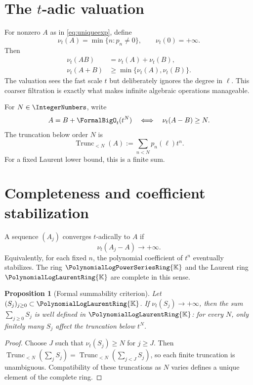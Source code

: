\documentclass[11pt,oneside,openany]{book}
\newtheorem{proposition}[theorem]{Proposition}
\newcommand{\K}{\mathbb{K}}
\newcommand{\Rring}{\PolynomialLogPowerSeriesRing{\K}}
\newcommand{\Pring}{\PolynomialLogLaurentRing{\K}}
\newcommand{\ordt}{\nu_t}
\newcommand{\TransseriesTruncateBelow}[2]{%
  \operatorname{Trunc}_{<#2}\!\left(#1\right)%
}
\begin{document}
\section{The \texorpdfstring{\(t\)}{t}-adic valuation}
For nonzero \(A\) as in \cref{eq:uniqueexp}, define
\begin{equation}\label{eq:valuation}
  \ordt(A)=\min\{n:p_n\neq0\},
  \qquad
  \ordt(0)=+\infty.
\end{equation}
Then
\begin{align}
 \ordt(AB)&=\ordt(A)+\ordt(B),\label{eq:valprod}\\
 \ordt(A+B)&\geq\min\{\ordt(A),\ordt(B)\}.
 \label{eq:valsum}
\end{align}
The valuation sees the fast scale \(t\) but deliberately ignores the degree in
\(\ell\).  This coarser filtration is exactly what makes infinite algebraic
operations manageable.

For \(N\in\IntegerNumbers\), write
\[
  A=B+\FormalBigO_t(t^N)
  \quad\Longleftrightarrow\quad
  \ordt(A-B)\geq N.
\]
The truncation below order \(N\) is
\begin{equation}\label{eq:truncdef}
  \TransseriesTruncateBelow{A}{N}:=\sum_{n<N}p_n(\ell)t^n.
\end{equation}
For a fixed Laurent lower bound, this is a finite sum.

\section{Completeness and coefficient stabilization}
A sequence \((A_j)\) converges \(t\)-adically to \(A\) if
\[
  \ordt(A_j-A)\longrightarrow+\infty.
\]
Equivalently, for each fixed \(n\), the polynomial coefficient of \(t^n\)
eventually stabilizes.  The ring \(\Rring\) and the Laurent ring \(\Pring\) are
complete in this sense.

\begin{proposition}[Formal summability criterion]\label{prop:summability}
Let \((S_j)_{j\geq0}\subset\Pring\).  If
\(\ordt(S_j)\to+\infty\), then the sum \(\sum_{j\geq0}S_j\) is well defined in
\(\Pring\): for every \(N\), only finitely many \(S_j\) affect the truncation
below \(t^N\).
\end{proposition}

\begin{proof}
Choose \(J\) such that \(\ordt(S_j)\geq N\) for \(j\geq J\).  Then
\(\TransseriesTruncateBelow{\sum_jS_j}{N}
=\TransseriesTruncateBelow{\sum_{j<J}S_j}{N}\), so each finite truncation is
unambiguous.  Compatibility of these truncations as \(N\) varies defines a
unique element of the complete ring.
\end{proof}
\end{document}
